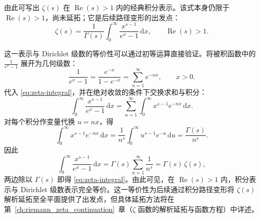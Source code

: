 由此可写出 $\zeta(s)$ 在 $\operatorname{Re}(s)>1$ 内的经典积分表示。该式本身仍限于 $\operatorname{Re}(s)>1$，尚未延拓；它是后续路径变形的出发点：
\begin{equation}
    \zeta(s) = \frac{1}{\Gamma(s)} \int_0^\infty \frac{x^{s-1}}{e^x-1}\,\mathrm{d}x,
    \qquad \operatorname{Re}(s)>1.
    \label{eq:zeta-integral}
\end{equation}

这一表示与 Dirichlet 级数的等价性可以通过初等运算直接验证。将被积函数中的 \(\frac{1}{e^x-1}\) 展开为几何级数：
\[
\frac{1}{e^x-1} = \frac{e^{-x}}{1-e^{-x}} = \sum_{n=1}^\infty e^{-nx}, \qquad x>0.
\]
代入 \eqref{eq:zeta-integral}，并在绝对收敛的条件下交换求和与积分：
\[
\int_0^\infty \frac{x^{s-1}}{e^x-1}\,\mathrm{d}x
= \sum_{n=1}^\infty \int_0^\infty x^{s-1} e^{-nx}\,\mathrm{d}x.
\]
对每个积分作变量代换 \(u = nx\)，得
\[
\int_0^\infty x^{s-1} e^{-nx}\,\mathrm{d}x = \frac{1}{n^s} \int_0^\infty u^{s-1} e^{-u}\,\mathrm{d}u = \frac{\Gamma(s)}{n^s}.
\]
因此
\[
\int_0^\infty \frac{x^{s-1}}{e^x-1}\,\mathrm{d}x = \Gamma(s) \sum_{n=1}^\infty \frac{1}{n^s} = \Gamma(s)\,\zeta(s),
\]
两边除以 \(\Gamma(s)\) 即得 \eqref{eq:zeta-integral}。由此可见，在 \(\operatorname{Re}(s)>1\) 内，积分表示与 Dirichlet 级数表示完全等价。这一等价性为后续通过积分路径变形将 \(\zeta(s)\) 解析延拓至全平面提供了出发点，但具体延拓方法将在第~\ref{ch:riemann_zeta_continuation}~章（$\zeta$ 函数的解析延拓与函数方程）中详述。

\begin{center}
\end{center}

